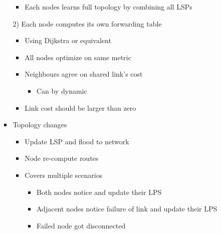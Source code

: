 \begin{itemize}
\begin{itemize}
\begin{itemize}
\begin{itemize}
                        \item Each nodes learns full topology by combining all LSPs
                    \end{itemize}
                \item[2)] Each node computes its own forwarding table
                    \begin{itemize}
                        \item Using Dijkstra or equivalent
                        \item All nodes optimize on same metric
                        \item Neighbours agree on shared link's cost
                            \begin{itemize}
                                \item Can by dynamic
                            \end{itemize}
                        \item Link cost should be larger than zero
                    \end{itemize}
                \item Topology changes
                    \begin{itemize}
                        \item Update LSP and flood to network
                        \item Node re-compute routes
                        \item Covers multiple scenarios
                            \begin{itemize}
                                    \begin{itemize}
                                        \item Both nodes notice and update their LPS
                                    \end{itemize}
                                    \begin{itemize}
                                        \item Adjacent nodes notice failure of link and update their LPS
                                        \item Failed node got disconnected
                                    \end{itemize}

\end{itemize}
\end{itemize}
\end{itemize}
\end{itemize}
\end{itemize}
